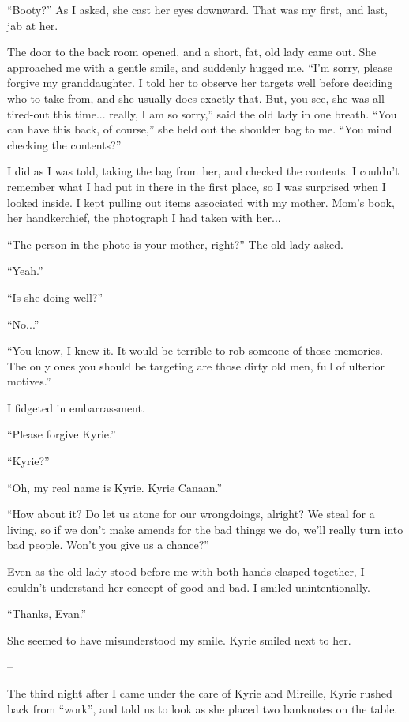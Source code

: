 \documentclass[oneside]{book}
\begin{document}
“Booty?” As I asked, she cast her eyes downward. That was my first, and last, jab at her.

The door to the back room opened, and a short, fat, old lady came out. She approached me with a gentle smile, and suddenly hugged me. “I’m sorry, please forgive my granddaughter. I told her to observe her targets well before deciding who to take from, and she usually does exactly that. But, you see, she was all tired-out this time... really, I am so sorry,” said the old lady in one breath. “You can have this back, of course,” she held out the shoulder bag to me. “You mind checking the contents?”

I did as I was told, taking the bag from her, and checked the contents. I couldn’t remember what I had put in there in the first place, so I was surprised when I looked inside. I kept pulling out items associated with my mother. Mom’s book, her handkerchief, the photograph I had taken with her...

“The person in the photo is your mother, right?” The old lady asked.

“Yeah.”

“Is she doing well?”

“No...”

“You know, I knew it. It would be terrible to rob someone of those memories. The only ones you should be targeting are those dirty old men, full of ulterior motives.”

I fidgeted in embarrassment.

“Please forgive Kyrie.”

“Kyrie?”

“Oh, my real name is Kyrie. Kyrie Canaan.”

“How about it? Do let us atone for our wrongdoings, alright? We steal for a living, so if we don’t make amends for the bad things we do, we’ll really turn into bad people. Won’t you give us a chance?”

Even as the old lady stood before me with both hands clasped together, I couldn’t understand her concept of good and bad. I smiled unintentionally.

“Thanks, Evan.”

She seemed to have misunderstood my smile. Kyrie smiled next to her.

–

The third night after I came under the care of Kyrie and Mireille, Kyrie rushed back from “work”, and told us to look as she placed two banknotes on the table.
\end{document}
